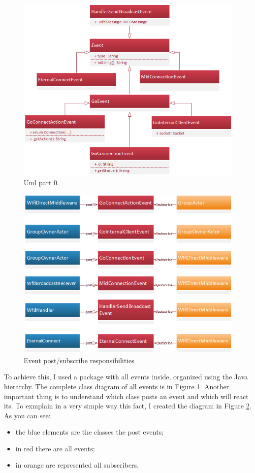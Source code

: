 \begin{figure}[thpb]
	\centering
	\includegraphics[scale=0.7]{./images/chap2/event-hyerarchy.png}
	\caption{Uml part 0.}
	\label{event-hyeranchy}
\end{figure}	

\begin{figure}[thpb]
	\centering
	\includegraphics[scale=0.7]{./images/chap2/event-subscribe-post.png}
	\caption{Event post/subscribe responsibilities}
	\label{event-subscribe-post}
\end{figure}	

To achieve this, I used a package with all events inside, organized using the Java hierarchy. The complete class diagram of all events is in Figure \ref{event-hyeranchy}.
Another important thing is to understand which class posts an event and which will react its. To exmplain in a very simple way this fact, I created the diagram in Figure \ref{event-subscribe-post}. As you can see:
\begin{itemize}
	\item the blue elements are the classes the post events;
	\item in red there are all events;
	\item in orange are represented all subscribers.
\end{itemize}

